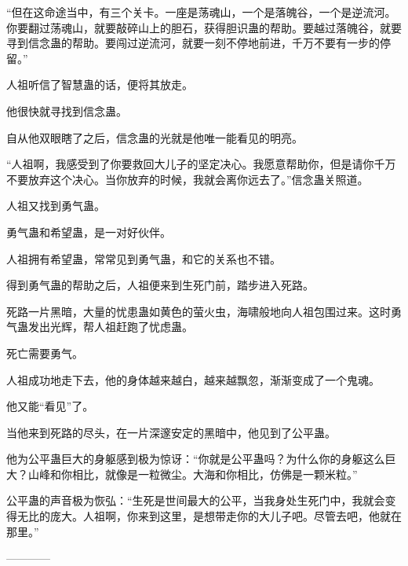 \begin{this_body}
“但在这命途当中，有三个关卡。一座是荡魂山，一个是落魄谷，一个是逆流河。你要翻过荡魂山，就要敲碎山上的胆石，获得胆识蛊的帮助。要越过落魄谷，就要寻到信念蛊的帮助。要闯过逆流河，就要一刻不停地前进，千万不要有一步的停留。”

人祖听信了智慧蛊的话，便将其放走。

他很快就寻找到信念蛊。

自从他双眼瞎了之后，信念蛊的光就是他唯一能看见的明亮。

“人祖啊，我感受到了你要救回大儿子的坚定决心。我愿意帮助你，但是请你千万不要放弃这个决心。当你放弃的时候，我就会离你远去了。”信念蛊关照道。

人祖又找到勇气蛊。

勇气蛊和希望蛊，是一对好伙伴。

人祖拥有希望蛊，常常见到勇气蛊，和它的关系也不错。

得到勇气蛊的帮助之后，人祖便来到生死门前，踏步进入死路。

死路一片黑暗，大量的忧患蛊如黄色的萤火虫，海啸般地向人祖包围过来。这时勇气蛊发出光辉，帮人祖赶跑了忧虑蛊。

死亡需要勇气。

人祖成功地走下去，他的身体越来越白，越来越飘忽，渐渐变成了一个鬼魂。

他又能“看见”了。

当他来到死路的尽头，在一片深邃安定的黑暗中，他见到了公平蛊。

他为公平蛊巨大的身躯感到极为惊讶：“你就是公平蛊吗？为什么你的身躯这么巨大？山峰和你相比，就像是一粒微尘。大海和你相比，仿佛是一颗米粒。”

公平蛊的声音极为恢弘：“生死是世间最大的公平，当我身处生死门中，我就会变得无比的庞大。人祖啊，你来到这里，是想带走你的大儿子吧。尽管去吧，他就在那里。”

------------

\end{this_body}

